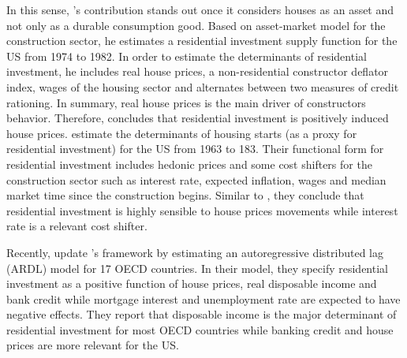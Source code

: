 \documentclass[12pt, a4paper]{article}
\begin{document}
In this sense, \citeauthor*{poterba_tax_1984}'s \citeyear{poterba_tax_1984} contribution stands out once it considers houses as an asset and not only as a durable consumption good.
Based on asset-market model for the construction sector, he estimates a residential investment supply function for the US from 1974 to 1982.
In order to estimate the determinants of residential investment, he includes real house prices, a non-residential constructor deflator index, wages of the housing sector and alternates between two measures  of  credit  rationing.
In summary, real house prices is the main driver of constructors behavior.
Therefore, \textcite{poterba_tax_1984} concludes that residential investment is positively induced house prices.
\textcite{topel_1988_Housing} estimate the determinants of housing starts (as a proxy for residential investment) for the US from 1963 to 183.
Their functional form for residential investment includes hedonic prices and some cost shifters for the construction sector such as interest rate, expected inflation, wages and median market time since the construction begins.
Similar to \textcite{poterba_tax_1984}, they conclude that residential investment is highly sensible to house prices movements while interest rate is a relevant cost shifter.

Recently,  \textcite{arestis_residential_2015} update \citeauthor*{poterba_tax_1984}'s \citeyear{poterba_tax_1984} framework by estimating an autoregressive distributed lag (ARDL) model for 17 OECD countries.
In their model, they specify residential investment as a positive function of house prices, real disposable income and bank credit while mortgage interest and unemployment rate are expected to have negative effects.
They report that disposable income is the major determinant of residential investment for most OECD countries while banking credit and house prices are more relevant for the US.
\end{document}
